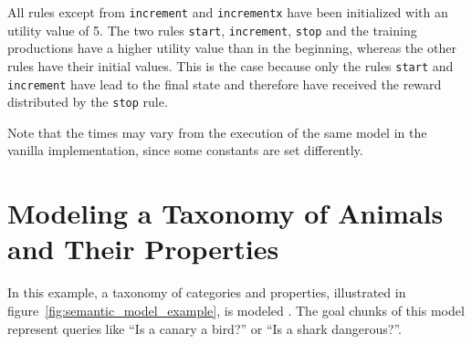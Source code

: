 All rules except from \lstinline|increment| and \lstinline|incrementx| have been initialized with an utility value of 5. The two rules \lstinline|start|, \lstinline|increment|, \lstinline|stop| and the training productions have a higher utility value than in the beginning, whereas the other rules have their initial values. This is the case because only the rules \lstinline|start| and \lstinline|increment| have lead to the final state and therefore have received the reward distributed by the \lstinline|stop| rule.

Note that the times may vary from the execution of the same model in the vanilla implementation, since some constants are set differently.


\section{Modeling a Taxonomy of Animals and Their Properties}

In this example, a taxonomy of categories and properties, illustrated in figure~\ref{fig:semantic_model_example}, is modeled \cite[unit 1, pp. 24\psqq]{actr_tutorial}. The goal chunks of this model represent queries like ``Is a canary a bird?'' or ``Is a shark dangerous?''.

